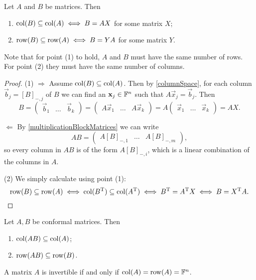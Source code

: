 \begin{proposition} \label{rowColSubspaces}
Let $A$ and $B$ be matrices. Then
\begin{enumerate}
\item $\operatorname{col}(B)\subseteq \operatorname{col}(A) \iff B = AX$ for some matrix $X$;
\item $\operatorname{row}(B)\subseteq \operatorname{row}(A) \iff B = YA$ for some matrix $Y$.
\end{enumerate}
\end{proposition}
Note that for point (1) to hold, $A$ and $B$ must have the same number of rows. For point (2) they must have the same number of columns.
\begin{proof}
(1) $\boxed{\Rightarrow}$ Assume $\operatorname{col}(B)\subseteq \operatorname{col}(A)$. Then   by \ref{columnSpace}, for each column $\vec{b}_j = [B]_{-,j}$ of $B$ we can find an $\boldsymbol{\mathrm{x}}_j\in \mathbb{F}^n$ such that $A\vec{x}_j = \vec{b}_j$. Then
\[ B = \begin{pmatrix}
\vec{b}_1 & \hdots & \vec{b}_k
\end{pmatrix} = \begin{pmatrix}
A\vec{x}_1 & \hdots & A\vec{x}_k
\end{pmatrix} = A \begin{pmatrix}
\vec{x}_1 & \hdots & \vec{x}_k
\end{pmatrix} = AX.\]

$\boxed{\Leftarrow}$ By \ref{multiplicationBlockMatrices} we can write
\[ AB = \begin{pmatrix}
A[B]_{-,1} & \hdots & A[B]_{-,m}
\end{pmatrix}, \]
so every column in $AB$ is of the form $A[B]_{-,i}$, which is a linear combination of the columns in $A$.

(2) We simply calculate using point (1):
\[ \operatorname{row}(B)\subseteq \operatorname{row}(A) \iff \operatorname{col}(B^{\mathrm{T}})\subseteq \operatorname{col}(A^{\mathrm{T}}) \iff B^{\mathrm{T}} = A^{\mathrm{T}} X \iff B = X^{\mathrm{T}} A. \]
\end{proof}
\begin{corollary} \label{RowColSpaceProduct}
Let $A,B$ be conformal matrices. Then
\begin{enumerate}
\item $\operatorname{col}(AB)\subseteq \operatorname{col}(A)$;
\item $\operatorname{row}(AB)\subseteq \operatorname{row}(B)$.
\end{enumerate}
\end{corollary}
\begin{corollary} \label{RowColSpaceInverse}
A matrix $A$ is invertible \textup{if and only if} $\operatorname{col}(A) = \operatorname{row}(A) = \mathbb{F}^n$.
\end{corollary}
